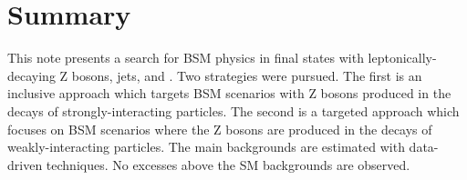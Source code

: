 \section{Summary}

This note presents a search for BSM physics in final states with leptonically-decaying Z bosons, jets, and \MET. 
Two strategies were pursued. The first is an inclusive approach which targets BSM scenarios with Z bosons produced
in the decays of strongly-interacting particles. The second is a targeted approach which focuses on BSM scenarios
where the Z bosons are produced in the decays of weakly-interacting particles. The main backgrounds are
estimated with data-driven techniques. No excesses above the SM backgrounds are observed.
